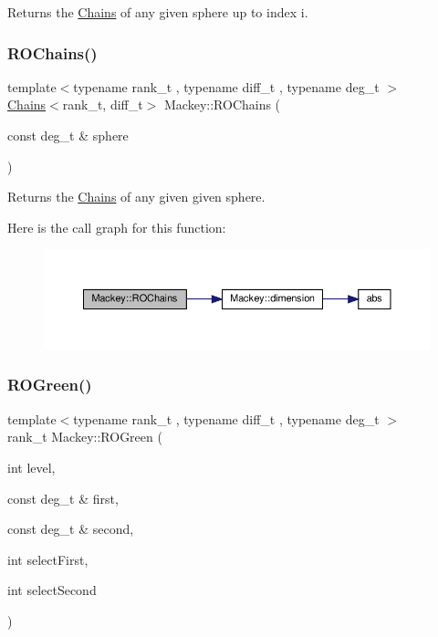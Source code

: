 Returns the \hyperlink{classMackey_1_1Chains}{Chains} of any given sphere up to index i. 

\mbox{\label{namespaceMackey_abd3c2e12c91baa573c6dbaa37eeb0518}} 
\subsubsection{\texorpdfstring{R\+O\+Chains()}{ROChains()}\hspace{0.1cm}{\footnotesize\ttfamily [2/2]}}
{\footnotesize\ttfamily template$<$typename rank\+\_\+t , typename diff\+\_\+t , typename deg\+\_\+t $>$ \\
\hyperlink{classMackey_1_1Chains}{Chains}$<$rank\+\_\+t, diff\+\_\+t$>$ Mackey\+::\+R\+O\+Chains (\begin{DoxyParamCaption}\item[{const deg\+\_\+t \&}]{sphere }\end{DoxyParamCaption})}



Returns the \hyperlink{classMackey_1_1Chains}{Chains} of any given given sphere. 

Here is the call graph for this function\+:\nopagebreak
\begin{figure}[H]
\begin{center}
\leavevmode
\includegraphics[width=350pt]{namespaceMackey_abd3c2e12c91baa573c6dbaa37eeb0518_cgraph}
\end{center}
\end{figure}
\mbox{\label{namespaceMackey_a2bd86833844ca62d76c47a54aeb0bb77}} 
\subsubsection{\texorpdfstring{R\+O\+Green()}{ROGreen()}\hspace{0.1cm}{\footnotesize\ttfamily [1/2]}}
{\footnotesize\ttfamily template$<$typename rank\+\_\+t , typename diff\+\_\+t , typename deg\+\_\+t $>$ \\
rank\+\_\+t Mackey\+::\+R\+O\+Green (\begin{DoxyParamCaption}\item[{int}]{level,  }\item[{const deg\+\_\+t \&}]{first,  }\item[{const deg\+\_\+t \&}]{second,  }\item[{int}]{select\+First,  }\item[{int}]{select\+Second }\end{DoxyParamCaption})}



